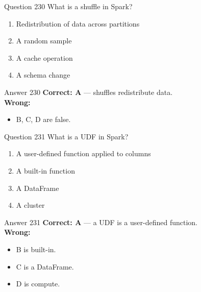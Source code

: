 \documentclass[aspectratio=169,11pt]{beamer}
\begin{document}
	\begin{frame}{Question 230}
		What is a shuffle in Spark?
		\begin{enumerate}[label=\Alph*.]
			\item Redistribution of data across partitions
			\item A random sample
			\item A cache operation
			\item A schema change
		\end{enumerate}
	\end{frame}
	\begin{frame}{Answer 230}
		\textbf{Correct: A} --- shuffles redistribute data.\\
		\vspace{0.5em}
		\textbf{Wrong:}
		\begin{itemize}
			\item B, C, D are false.
		\end{itemize}
	\end{frame}
	
	\begin{frame}{Question 231}
		What is a UDF in Spark?
		\begin{enumerate}[label=\Alph*.]
			\item A user-defined function applied to columns
			\item A built-in function
			\item A DataFrame
			\item A cluster
		\end{enumerate}
	\end{frame}
	\begin{frame}{Answer 231}
		\textbf{Correct: A} --- a UDF is a user-defined function.\\
		\vspace{0.5em}
		\textbf{Wrong:}
		\begin{itemize}
			\item B is built-in.
			\item C is a DataFrame.
			\item D is compute.
		\end{itemize}
	\end{frame}
	
\end{document}
